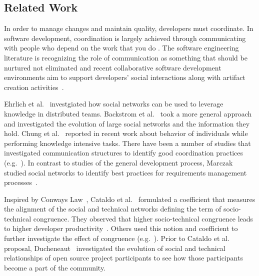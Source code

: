 \subsection{Related Work}
\label{sec:relwork}
In order to manage changes and maintain quality, developers must coordinate. In
software development, coordination is largely achieved through communicating with
people who depend on the work that you do \cite{kraut:1995coordination}. The
software engineering literature is recognizing the role of communication as
something that should be nurtured not eliminated and recent
collaborative software development environments aim to support developers'
social interactions along with artifact creation activities~\cite{nakakoji2010:rdc}.

Ehrlich et al.~\cite{ehrlich:icgse:2006} investgiated how social networks can be
used to leverage knowledge in distributed teams. Backstrom et
al.~\cite{backstrom:kdd:2006} took a more general approach and investigated the
evolution of large social networks and the information they hold. Chung et
al.~\cite{chung:cpr:07} reported in recent work about behavior of individuals
while performing knowledge intensive tasks. There have been a number of studies
that investigated communication structures to identify good
coordination practices
(e.g.~\cite{hinds:cscw:2006,hossain:cscw:2006,bird:fse:2008,hinds:hicss:2008}). In contrast to studies of the general development process, Marczak studied social
networks to identify best practices for requirements management
processes~\cite{marczak:re:2008}.

Inspired by Conways Law~\cite{conway:datamination:1968}, Cataldo et
al.~\cite{cataldo:cscw:2006,cataldo:esem:2008} formulated a coefficient that
measures the alignment of the social and technical networks defining the term of
socio-technical congruence. They observed that higher socio-technical congruence
leads to higher developer
productivity~\cite{cataldo:cscw:2006,cataldo:esem:2008}. Others used this
notion and coefficient to further investigate the effect of congruence
(e.g.~\cite{valetto:msr:2007}). Prior to Cataldo et
al.~\cite{cataldo:cscw:2006,cataldo:esem:2008} proposal,
Ducheneaut~\cite{ducheneaut:cscw:2005} investigated the evolution of social and
technical relationships of open source project participants to see how those
participants become a part of the community.

